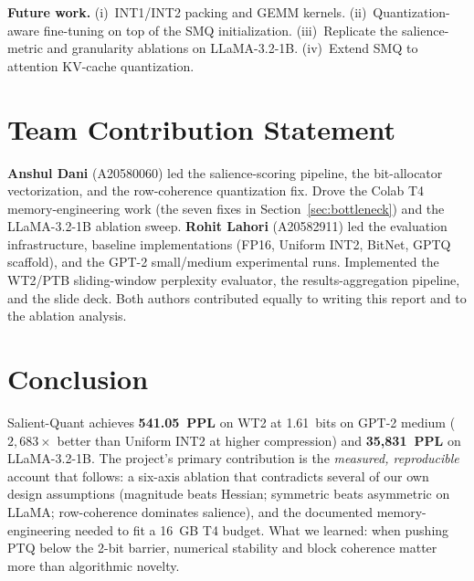 \documentclass[11pt]{article}
\begin{document}
\textbf{Future work.}
(i)~INT1/INT2 packing and GEMM kernels.
(ii)~Quantization-aware fine-tuning on top of the SMQ initialization.
(iii)~Replicate the salience-metric and granularity ablations on LLaMA-3.2-1B.
(iv)~Extend SMQ to attention KV-cache quantization.

\section{Team Contribution Statement}
\label{sec:contrib}

\textbf{Anshul Dani} (A20580060) led the salience-scoring pipeline, the bit-allocator
vectorization, and the row-coherence quantization fix.
Drove the Colab T4 memory-engineering work (the seven fixes in
Section~\ref{sec:bottleneck}) and the LLaMA-3.2-1B ablation sweep.
\textbf{Rohit Lahori} (A20582911) led the evaluation infrastructure, baseline
implementations (FP16, Uniform INT2, BitNet, GPTQ scaffold), and the GPT-2 small/medium
experimental runs.
Implemented the WT2/PTB sliding-window perplexity evaluator, the results-aggregation
pipeline, and the slide deck.
Both authors contributed equally to writing this report and to the ablation analysis.

\section{Conclusion}
\label{sec:conclusion}

Salient-Quant achieves \textbf{541.05~PPL} on WT2 at 1.61~bits on GPT-2 medium
($2{,}683\times$ better than Uniform INT2 at higher compression) and
\textbf{35{,}831~PPL} on LLaMA-3.2-1B.
The project's primary contribution is the \emph{measured, reproducible} account that
follows: a six-axis ablation that contradicts several of our own design assumptions
(magnitude beats Hessian; symmetric beats asymmetric on LLaMA; row-coherence dominates
salience), and the documented memory-engineering needed to fit a 16~GB T4 budget.
What we learned: when pushing PTQ below the 2-bit barrier, numerical stability and block
coherence matter more than algorithmic novelty.
\end{document}
